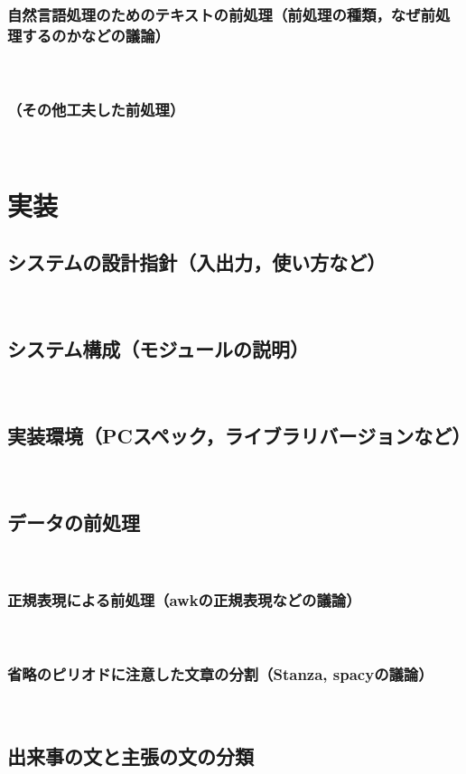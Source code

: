 \documentclass[12pt,a4j]{jreport}
\begin{document}
\subsection{自然言語処理のためのテキストの前処理（前処理の種類，なぜ前処理するのかなどの議論）}
~

\subsection{（その他工夫した前処理）}
~


\chapter{実装}


\section{システムの設計指針（入出力，使い方など）}
~

\section{システム構成（モジュールの説明）}
~

\section{実装環境（PCスペック，ライブラリバージョンなど）}
~

\section{データの前処理}
~

\subsection{正規表現による前処理（awkの正規表現などの議論）}
~

\subsection{省略のピリオドに注意した文章の分割（Stanza, spacyの議論）}
~

\section{出来事の文と主張の文の分類}
~
\end{document}
